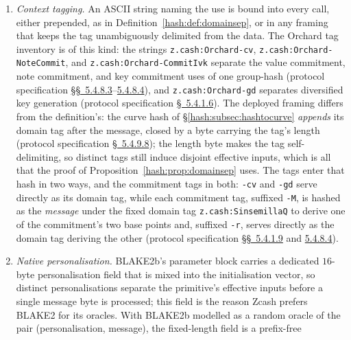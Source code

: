 \documentclass[11pt,a4paper]{article}
\theoremstyle{definition}
\theoremstyle{remark}
\begin{document}
\begin{enumerate}
\item \emph{Context tagging.} An ASCII string naming the use is bound
  into every call, either prepended, as in
  Definition~\ref{hash:def:domainsep}, or in any framing that keeps
  the tag unambiguously delimited from the data. The Orchard tag
  inventory is of this kind: the strings
  \texttt{z.cash:\allowbreak Orchard-cv},
  \texttt{z.cash:\allowbreak Orchard-NoteCommit}, and
  \texttt{z.cash:\allowbreak Orchard-CommitIvk} separate the value
  commitment, note commitment, and key commitment uses of one
  group-hash (protocol specification \href{https://zips.z.cash/protocol/protocol.pdf\#concretehomomorphiccommit}{\S\S~5.4.8.3}--\href{https://zips.z.cash/protocol/protocol.pdf\#concretesinsemillacommit}{5.4.8.4}), and
  \texttt{z.cash:\allowbreak Orchard-gd} separates diversified key
  generation (protocol specification \href{https://zips.z.cash/protocol/protocol.pdf\#concretediversifyhash}{\S~5.4.1.6}). The deployed
  framing differs from the definition's: the curve hash of
  \S\ref{hash:subsec:hashtocurve} \emph{appends} its domain tag after
  the message, closed by a byte
  carrying the tag's length (protocol specification \href{https://zips.z.cash/protocol/protocol.pdf\#concretegrouphashpallasandvesta}{\S~5.4.9.8}); the
  length byte makes the tag self-delimiting, so distinct tags still
  induce disjoint effective inputs, which is all that the proof of
  Proposition~\ref{hash:prop:domainsep} uses. The tags enter that
  hash in two ways, and the commitment tags in both: \texttt{-cv}
  and \texttt{-gd} serve directly as its domain tag, while each
  commitment tag, suffixed \texttt{-M}, is hashed as the
  \emph{message} under the fixed domain tag
  \texttt{z.cash:\allowbreak SinsemillaQ} to derive one of the
  commitment's two base points and, suffixed \texttt{-r}, serves
  directly as the domain tag deriving the other (protocol specification
  \href{https://zips.z.cash/protocol/protocol.pdf\#concretesinsemillahash}{\S\S~5.4.1.9} and \href{https://zips.z.cash/protocol/protocol.pdf\#concretesinsemillacommit}{5.4.8.4}).
\item \emph{Native personalisation.} BLAKE2b's parameter block carries
  a dedicated \(16\)-byte personalisation field that is mixed into the
  initialisation vector, so distinct personalisations separate the
  primitive's effective inputs before a single message byte is
  processed; this field is the reason Zcash prefers BLAKE2 for its
  oracles. With BLAKE2b modelled as a random oracle of the pair
  (personalisation, message), the fixed-length field is a prefix-free

\end{enumerate}
\end{document}
